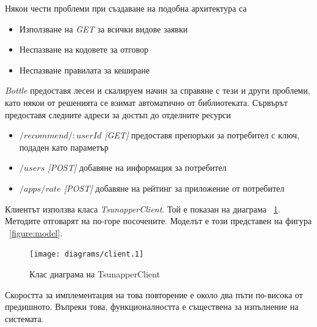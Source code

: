 		Някои чести проблеми при създаване на подобна архитектура са\cite{Vitvar}
		
		\begin{itemize}
			\item Използване на \emph{GET} за всички видове заявки
			\item Неспазване на кодовете за отговор
			\item Неспазване правилата за кеширане
		\end{itemize}
		
		\emph{Bottle} предоставя лесен и скалируем начин за справяне с тези и други проблеми, като някои от решенията се взимат автоматично от библиотеката. Сървърът предоставя следните адреси за достъп до отделните ресурси
		
		\begin{itemize}
			\item \emph{$/recommend/:userId$ [GET]} предоставя препоръки за потребител с ключ, подаден като параметър
			\item \emph{$/users$ [POST]} добавяне на информация за потребител
			\item \emph{$/apps/rate$ [POST]} добавяне на рейтинг за приложение от потребител
		\end{itemize}
		
		Клиентът използва класа \emph{TsunapperClient}. Той е показан на диаграма ~\ref{figure:client}. Методите отговарят на по-горе посочените. Моделът е този представен на фигура ~\ref{figure:model}.
		
		\begin{figure}[htbp]
			\centering
 			\texttt{[image: diagrams/client.1]}
			\caption{Клас диаграма на TsunapperClient}
			\label{figure:client}
		\end{figure}
		
		Скоростта за имплементация на това повторение е около два пъти по-висока от предишното. Въпреки това, функционалността е съществена за изпълнение на системата.